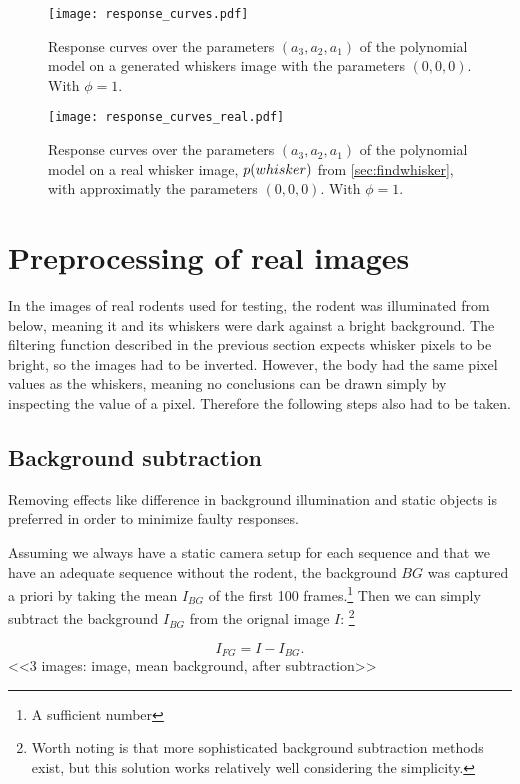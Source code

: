 \begin{figure}
    \centering
    \texttt{[image: response\_curves.pdf]}
    \caption{
        Response curves over the parameters $(a_3,a_2,a_1)$ of the polynomial model on a generated whiskers image with the parameters $(0,0,0)$. With $\phi=1$.
    }
    \label{fig:response_generated}
\end{figure}
\begin{figure}
    \centering
    \texttt{[image: response\_curves\_real.pdf]}
    \caption{
        Response curves over the parameters $(a_3,a_2,a_1)$ of the polynomial model on a real whisker image, $p{(whisker)}$ from \ref{sec:findwhisker},
        with approximatly the parameters $(0,0,0)$. With $\phi=1$.
    }
    \label{fig:response_real}
\end{figure}

\section{Preprocessing of real images}
\label{prep-real}

In the images of real rodents used for testing, the rodent was
illuminated from below, meaning it and its whiskers were dark against
a bright background. The filtering function described in the previous
section expects whisker pixels to be bright, so the images had to be
inverted. However, the body had the same pixel values as the whiskers,
meaning no conclusions can be drawn simply by inspecting the value of
a pixel. Therefore the following steps also had to be taken.

\subsection{Background subtraction}
Removing effects like difference in background illumination and static
objects is preferred in order to minimize faulty responses.

Assuming we always have a static camera setup for each sequence and
that we have an adequate sequence without the rodent, the background
$BG$ was captured a priori by taking the mean $I_{BG}$ of the first
100 frames.\footnote{A sufficient number} Then we can simply subtract
the background $I_{BG}$ from the orignal image $I$: \footnote{Worth
  noting is that more sophisticated background subtraction methods
  exist, but this solution works relatively well considering the
  simplicity.}

\begin{equation}
  I_{FG} = I - I_{BG}.
\end{equation}
<<3 images: image, mean background, after subtraction>>

